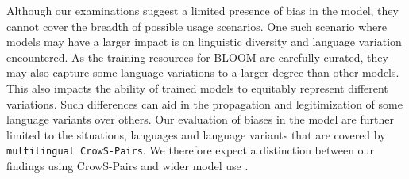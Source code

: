 \documentclass[twoside,11pt]{article}
\begin{document}
Although our examinations suggest a limited presence of bias in the model, they cannot cover the breadth of possible usage scenarios. One such scenario where models may have a larger impact is on linguistic diversity and language variation encountered.
As the training resources for BLOOM are carefully curated, they may also capture some language variations to a larger degree than other models. This also impacts the ability of trained models to equitably represent different variations. Such differences can aid in the propagation and legitimization of some language variants over others.
Our evaluation of biases in the model are further limited to the situations, languages and language variants that are covered by \texttt{multilingual CrowS-Pairs}.
We therefore expect a distinction between our findings using CrowS-Pairs and wider model use \citep[for a more detailed exploration on such differences, see][]{raji_AI_2021}.








\end{document}
